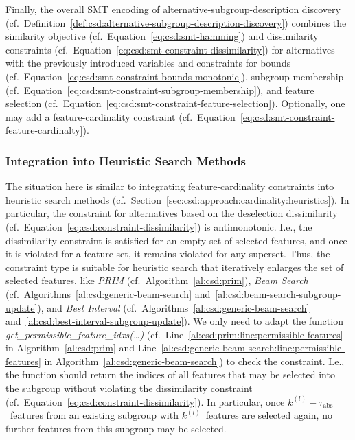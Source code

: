 \documentclass{article}
\theoremstyle{definition}
\begin{document}
Finally, the overall SMT encoding of alternative-subgroup-description discovery (cf.~Definition~\ref{def:csd:alternative-subgroup-description-discovery}) combines the similarity objective (cf.~Equation~\ref{eq:csd:smt-hamming}) and dissimilarity constraints (cf.~Equation~\ref{eq:csd:smt-constraint-dissimilarity}) for alternatives with the previously introduced variables and constraints for bounds (cf.~Equation~\ref{eq:csd:smt-constraint-bounds-monotonic}), subgroup membership (cf.~Equation~\ref{eq:csd:smt-constraint-subgroup-membership}), and feature selection (cf.~Equation~\ref{eq:csd:smt-constraint-feature-selection}).
Optionally, one may add a feature-cardinality constraint (cf.~Equation~\ref{eq:csd:smt-constraint-feature-cardinalty}).

\subsubsection{Integration into Heuristic Search Methods}
\label{sec:csd:approach:alternatives:heuristics}

The situation here is similar to integrating feature-cardinality constraints into heuristic search methods (cf.~Section~\ref{sec:csd:approach:cardinality:heuristics}).
In particular, the constraint for alternatives based on the deselection dissimilarity (cf.~Equation~\ref{eq:csd:constraint-dissimilarity}) is antimonotonic.
I.e., the dissimilarity constraint is satisfied for an empty set of selected features, and once it is violated for a feature set, it remains violated for any superset.
Thus, the constraint type is suitable for heuristic search that iteratively enlarges the set of selected features, like \emph{PRIM} (cf.~Algorithm~\ref{al:csd:prim}), \emph{Beam Search} (cf.~Algorithms~\ref{al:csd:generic-beam-search} and~\ref{al:csd:beam-search-subgroup-update}), and \emph{Best Interval} (cf.~Algorithms~\ref{al:csd:generic-beam-search} and~\ref{al:csd:best-interval-subgroup-update}).
We only need to adapt the function \emph{get\_permissible\_feature\_idxs(\dots)} (cf.~Line~\ref{al:csd:prim:line:permissible-features} in Algorithm~\ref{al:csd:prim} and Line~\ref{al:csd:generic-beam-search:line:permissible-features} in Algorithm~\ref{al:csd:generic-beam-search}) to check the constraint.
I.e., the function should return the indices of all features that may be selected into the subgroup without violating the dissimilarity constraint (cf.~Equation~\ref{eq:csd:constraint-dissimilarity}).
In particular, once $k^{(l)} - \tau_{\text{abs}}$~features from an existing subgroup with $k^{(l)}$~features are selected again, no further features from this subgroup may be selected.
\end{document}

